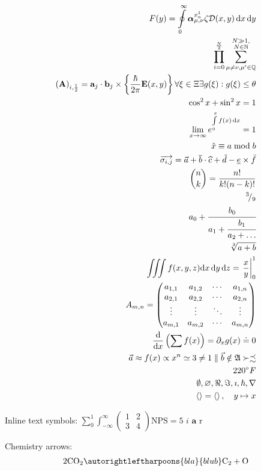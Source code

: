 \documentclass[11pt, oneside]{article}   	%
\begin{document}
\begin{eqnarray}
F(y) = \oint\limits_0^\infty\boldsymbol{\alpha}^{x^1_a}_{\mu, \nu} \zeta \mathcal{D}(x,y)\, \mathrm{d}x\, \mathrm{d}y\\
\prod_{i=0}^{\frac{N}{2}} \sum_{\mu\neq\nu, \mu'\in\mathbb{Q}}^{\substack{N\gg1,\\ N\in\mathbb{N}}} \\
\left(\mathbf{A}\right)_{i, \frac12} = \mathbf{a}_j\cdot\mathbf{b}_j\times \left\{\frac{\hbar}{2\pi} \mathbf{E}(x,y)\right\}
\forall \xi \in \Xi \exists g(\xi): g(\xi) \leq \theta \\
\cos^2{x} + \sin^2{x} = 1 \\
\lim_{x\to \infty} e^{\int\limits_0^x f(x)\, \mathrm{d}x} = 1 \\
\hat{x} \equiv a \bmod b \\
\overrightarrow{\sigma_{i,j}} = \vec{a} +  \overline{b} \cdot \widehat{c} + \tilde{d} - \underline{e} \times \ddot{f}\\
\binom{n}{k} = \frac{n!}{k!(n-k)!} \\
^3\!/_9 \\ %
a_0 + \cfrac{b_0}{a_1 + \cfrac{b_1}{a_2 + \dots}} \\ %
\sqrt[3]{a + b} \\
\iiint{f(x,y,z)} \mathrm{d}x\, \mathrm{d}y\, \mathrm{d}z = \left.\frac{x}{y}\right|_0^1 \\
A_{m,n} =
 \begin{pmatrix}
  a_{1,1} & a_{1,2} & \cdots & a_{1,n} \\
  a_{2,1} & a_{2,2} & \cdots & a_{2,n} \\
  \vdots  & \vdots  & \ddots & \vdots  \\
  a_{m,1} & a_{m,2} & \cdots & a_{m,n}
 \end{pmatrix} \\
\frac{\mathrm{d}}{\mathrm{d}x}\left(\sum f(x)\right) = \partial_x g(x) \doteq 0 \\
\vec{a} \approx f(x) \propto x^n \simeq 3 \neq 1 \parallel \vec{b} \notin \mathfrak{A} \succ \precsim \\
220^\circ F \\
\emptyset, \varnothing, \Re, \Im, \imath, \hbar, \nabla \\
\left\langle \right\rangle = \left< \right>, \quad y \mapsto x \\
\end{eqnarray}

Inline text symbols: $ \sum_0^1 \int_{-\infty}^\infty
\left(\begin{smallmatrix} 1 & 2\\3 & 4 \end{smallmatrix}\right) \text{NPS} = 5 \textit{ i } \textbf{a } \textrm{r }$

Chemistry arrows:
\begin{eqnarray}
2\text{CO}_2\autorightleftharpoons{bla}{blub} \text{C}_2 + \text{O}\\
\end{eqnarray}
\end{document}
